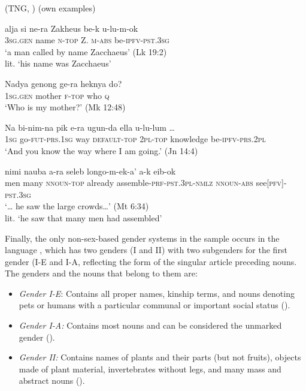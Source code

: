 \documentclass[output=collectionpaper]{langsci/langscibook}
\begin{document}
\ea
\label{ex:Svard:3}
 (TNG, ) (own examples)\\
\begin{xlist}
\ex
\gll alja si ne-ra Zakheus be-k u-lu{}-m-ok\\
     \textsc{3sg.gen} name \textsc{n-top} Z. \textsc{m-abs} be-\textsc{i}\textsc{pfv-pst.3sg}\\
\glt `a man called by name Zacchaeus' (Lk 19:2)\footnotemark{}\\
lit. `his name was Zacchaeus'

\ex
\gll Nadya genong ge-ra heknya do?\\
     \textsc{1sg.gen} mother \textsc{f-top} who \textsc{q}\\
\glt `Who is my mother?' (Mk 12:48)

\ex
\gll Na bi-nim-na pik e-ra ugun-da ella u-lu-lum …\\
     \textsc{1sg} go-\textsc{fut-prs.1sg} way \textsc{default-top} \textsc{2pl-top} knowledge be-\textsc{ipfv-prs.2pl} {}\\
\glt `And you know the way where I am going.' (Jn 14:4)

\ex
\gll {\ldots} nimi nauba a-ra seleb longo-m-ek-a' a-k eib-ok\\
    {} men many \textsc{nnoun-top} already assemble-\textsc{prf-pst.3pl-nmlz} \textsc{nnoun-abs} see[\textsc{pfv}]\textsc{{}-pst.3sg}\\
\glt `… he saw the large crowds…' (Mt 6:34)\\
lit. `he saw that many men had assembled'
\end{xlist}
\z
{}

Finally, the only non-sex-based gender systems in the sample occurs in the  language , which has two genders (I and II) with two subgenders for the first gender (I-E and I-A, reflecting the form of the singular article preceding nouns. The genders and the nouns that belong to them are:

\begin{itemize}
\item \textit{Gender I-E}: Contains all proper names, kinship terms, and nouns denoting pets or humans with a particular communal or important social status (\citealt[334--335]{Mosel2000}).

\item \textit{Gender I-A:} Contains most nouns and can be considered the unmarked gender (\citealt[336--338]{Mosel2000}).

\item \textit{Gender II:} Contains names of plants and their parts (but not fruits), objects made of plant material, invertebrates without legs, and many mass and abstract nouns (\citealt[338]{Mosel2000}).
\end{itemize}
\end{document}
